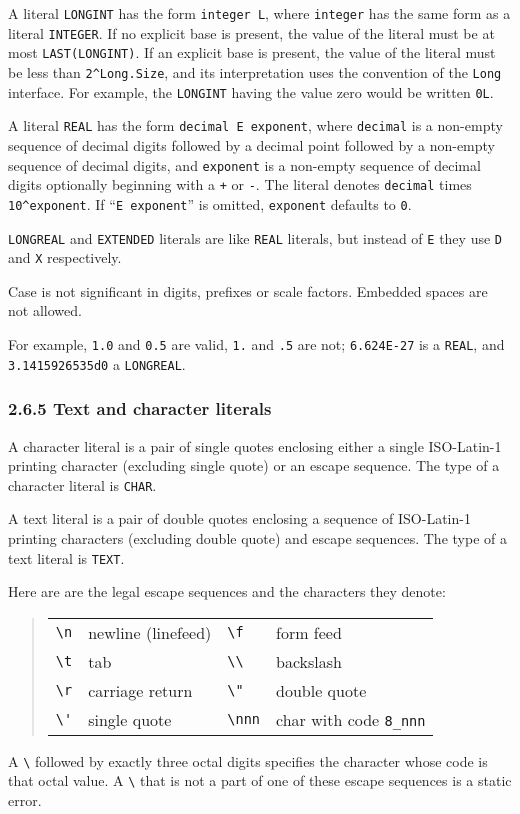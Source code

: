 \documentclass[10pt]{article}
\begin{document}
A literal \verb|LONGINT| has the form \verb|integer L|, where \verb|integer|
has the same form as a literal \verb|INTEGER|.  If no explicit base is
present, the value of the literal must be at most \verb|LAST(LONGINT)|.  If an
explicit base is present, the value of the literal must be less than
\verb|2^Long.Size|, and its interpretation uses the convention of the
\verb|Long| interface.  For example, the \verb|LONGINT| having the value zero
would be written \verb|0L|.

A literal \verb|REAL| has the form \verb|decimal E exponent|, where
\verb|decimal| is a non-empty sequence of decimal digits followed by a decimal
point followed by a non-empty sequence of decimal digits, and \verb|exponent|
is a non-empty sequence of decimal digits optionally beginning with a \verb|+|
or \verb|-|.  The literal denotes \verb|decimal| times \verb|10^exponent|.  If
``\verb|E exponent|'' is omitted, \verb|exponent| defaults to \verb|0|.

\verb|LONGREAL| and \verb|EXTENDED| literals are like \verb|REAL| literals,
but instead of \verb|E| they use \verb|D| and \verb|X| respectively.

Case is not significant in digits, prefixes or scale factors.  Embedded spaces
are not allowed.

For example, \verb|1.0| and \verb|0.5| are valid, \verb|1.| and \verb|.5| are
not; \verb|6.624E-27| is a \verb|REAL|, and \verb|3.1415926535d0| a
\verb|LONGREAL|.

\subsubsection*{2.6.5 Text and character literals}

A character literal is a pair of single quotes enclosing either a single
ISO-Latin-1 printing character (excluding single quote) or an escape sequence.
The type of a character literal is \verb|CHAR|.

A text literal is a pair of double quotes enclosing a sequence of ISO-Latin-1
printing characters (excluding double quote) and escape sequences.  The type
of a text literal is \verb|TEXT|.

Here are are the legal escape sequences and the characters they denote:
\begin{quote}
  \begin{tabular}{llll}
    \verb|\n| & newline (linefeed) & \verb|\f| & form feed \\
    \verb|\t| & tab                & \verb|\\| & backslash \\
    \verb|\r| & carriage return    & \verb|\"| & double quote \\
    \verb|\'| & single quote       & \verb|\nnn| & char with code \verb|8_nnn| \\
  \end{tabular}
\end{quote}
A \verb|\| followed by exactly three octal digits specifies the character
whose code is that octal value.  A \verb|\| that is not a part of one of these
escape sequences is a static error.
\end{document}

